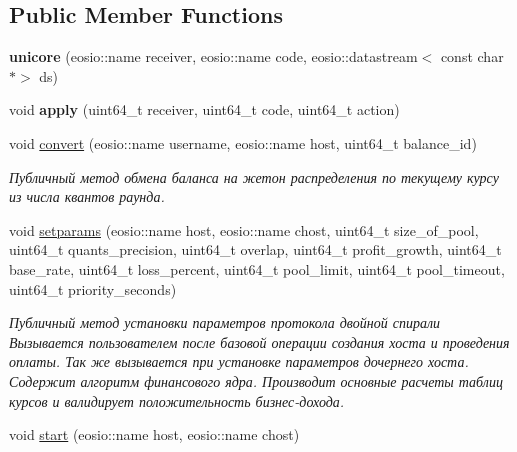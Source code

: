 \subsection*{Public Member Functions}
\begin{DoxyCompactItemize}
\item 
\mbox{\label{classeosio_1_1unicore_a6f8aab7d944e62d87dd03562f5ed76a7}} 
{\bfseries unicore} (eosio\+::name receiver, eosio\+::name code, eosio\+::datastream$<$ const char $\ast$$>$ ds)
\item 
\mbox{\label{classeosio_1_1unicore_a59303f0f27f097d80749a7dd0fc084ef}} 
void {\bfseries apply} (uint64\+\_\+t receiver, uint64\+\_\+t code, uint64\+\_\+t action)
\item 
\mbox{\label{classeosio_1_1unicore_a8a39c3fdbe0d6a386452d1c1f9bd3f27}} 
void \mbox{\hyperlink{classeosio_1_1unicore_a8a39c3fdbe0d6a386452d1c1f9bd3f27}{convert}} (eosio\+::name username, eosio\+::name host, uint64\+\_\+t balance\+\_\+id)
\begin{DoxyCompactList}\small\item\em Публичный метод обмена баланса на жетон распределения по текущему курсу из числа квантов раунда. \end{DoxyCompactList}\item 
void \mbox{\hyperlink{classeosio_1_1unicore_ac4def2358ff27c9454fcbbb71163f300}{setparams}} (eosio\+::name host, eosio\+::name chost, uint64\+\_\+t size\+\_\+of\+\_\+pool, uint64\+\_\+t quants\+\_\+precision, uint64\+\_\+t overlap, uint64\+\_\+t profit\+\_\+growth, uint64\+\_\+t base\+\_\+rate, uint64\+\_\+t loss\+\_\+percent, uint64\+\_\+t pool\+\_\+limit, uint64\+\_\+t pool\+\_\+timeout, uint64\+\_\+t priority\+\_\+seconds)
\begin{DoxyCompactList}\small\item\em Публичный метод установки параметров протокола двойной спирали Вызывается пользователем после базовой операции создания хоста и проведения оплаты. Так же вызывается при установке параметров дочернего хоста. Содержит алгоритм финансового ядра. Производит основные расчеты таблиц курсов и валидирует положительность бизнес-\/дохода. \end{DoxyCompactList}\item 
void \mbox{\hyperlink{classeosio_1_1unicore_a6d49834320bcf0133e9399a3b45ac3e5}{start}} (eosio\+::name host, eosio\+::name chost)
$$
\end{DoxyCompactItemize}
